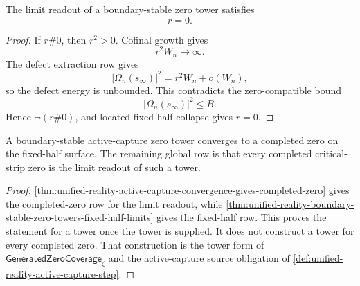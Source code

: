 \begin{theorem}
\label{thm:unified-reality-boundary-stable-zero-towers-fixed-half-limits}
The limit readout of a boundary-stable zero tower satisfies
$$
r=0.
$$
\end{theorem}

\begin{proof}
If $r\#0$, then $r^2>0$.  Cofinal growth gives
$$
r^2W_n\to\infty.
$$
The defect extraction row gives
$$
|\Omega_n(s_{\infty})|^2=r^2W_n+o(W_n),
$$
so the defect energy is unbounded.  This contradicts the
zero-compatible bound
$$
|\Omega_n(s_{\infty})|^2\le B.
$$
Hence $\neg(r\#0)$, and located fixed-half collapse gives $r=0$.
\end{proof}

\begin{corollary}
\label{cor:unified-reality-tower-route-separates-convergence-from-coverage}
A boundary-stable active-capture zero tower converges to a completed
zero on the fixed-half surface.  The remaining global row is that every
completed critical-strip zero is the limit readout of such a tower.
\end{corollary}

\begin{proof}
\autoref{thm:unified-reality-active-capture-convergence-gives-completed-zero}
gives the completed-zero row for the limit readout, while
\autoref{thm:unified-reality-boundary-stable-zero-towers-fixed-half-limits}
gives the fixed-half row.  This proves the statement for a tower once
the tower is supplied.  It does not construct a tower for every
completed zero.  That construction is the tower form of
$\mathsf{GeneratedZeroCoverage}_{\zeta}$ and the active-capture source
obligation of
\autoref{def:unified-reality-active-capture-step}.
\end{proof}

